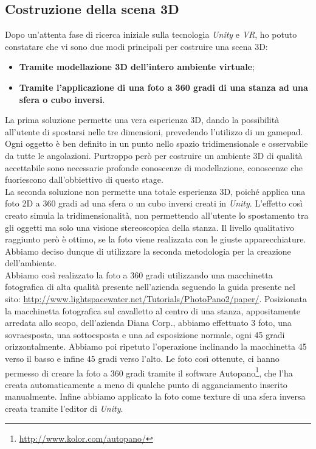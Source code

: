 \subsection{Costruzione della scena 3D}

Dopo un'attenta fase di ricerca iniziale sulla tecnologia \textit{Unity} e \textit{VR}, ho potuto constatare che vi sono due modi principali per costruire una scena 3D:

\begin{itemize}
	\item \textbf{Tramite modellazione 3D dell'intero ambiente virtuale};
	\item \textbf{Tramite l'applicazione di una foto a 360 gradi di una stanza ad una sfera o cubo inversi}.
\end{itemize}

La prima soluzione permette una vera esperienza 3D, dando la possibilità all'utente di spostarsi nelle tre dimensioni, prevedendo l'utilizzo di un gamepad. Ogni oggetto è ben definito in un punto nello spazio tridimensionale e osservabile da tutte le angolazioni. Purtroppo però per costruire un ambiente 3D di qualità accettabile sono necessarie profonde conoscenze di modellazione, conoscenze che fuoriescono dall'obbiettivo di questo stage. \\
La seconda soluzione non permette una totale esperienza 3D, poiché applica una foto 2D a 360 gradi ad una sfera o un cubo inversi creati in \textit{Unity}. L'effetto così creato simula la tridimensionalità, non permettendo all'utente lo spostamento tra gli oggetti ma solo una visione stereoscopica della stanza. Il livello qualitativo raggiunto però è ottimo, se la foto viene realizzata con le giuste apparecchiature. Abbiamo deciso dunque di utilizzare la seconda metodologia per la creazione dell'ambiente. \\
Abbiamo così realizzato la foto a 360 gradi utilizzando una macchinetta fotografica di alta qualità presente nell'azienda seguendo la guida presente nel sito: \url{http://www.lightspacewater.net/Tutorials/PhotoPano2/paper/}. Posizionata la macchinetta fotografica sul cavalletto al centro di una stanza, appositamente arredata allo scopo, dell'azienda Diana Corp., abbiamo effettuato 3 foto, una sovraesposta, una sottoesposta e una ad esposizione normale, ogni 45 gradi orizzontalmente. Abbiamo poi ripetuto l'operazione inclinando la macchinetta 45 verso il basso e infine 45 gradi verso l'alto. Le foto così ottenute, ci hanno permesso di creare la foto a 360 gradi tramite il software Autopano\footnote[2]{\url{http://www.kolor.com/autopano/}}, che l'ha creata automaticamente a meno di qualche punto di agganciamento inserito manualmente. Infine abbiamo applicato la foto come texture di una sfera inversa creata tramite l'editor di \textit{Unity}.

